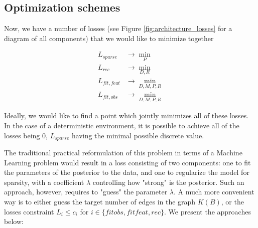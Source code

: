 \documentclass[a4paper,11pt,oneside]{report}
\begin{document}

\subsection{Optimization schemes}
Now, we have a number of losses (see Figure \ref{fig:architecture_losses} for a diagram of all components) that we would like to minimize together

\begin{equation}
\label{eq:all_losses}
\begin{array}{lc}
L_{sparse}&\to\min\limits_P\\
L_{rec}&\to\min\limits_{D,R}\\
L_{fit, feat}&\to\min\limits_{D,M,P,R}\\
L_{fit, obs}&\to\min\limits_{D,M,P,R}
\end{array}
\end{equation}

Ideally, we would like to find a point which jointly minimizes all of these losses. In the case of a deterministic environment, it is possible to achieve all of the losses being $0$, $L_{sparse}$ having the minimal possible discrete value.

The traditional practical reformulation of this problem in terms of a Machine Learning problem would result in a loss consisting of two components: one to fit the parameters of the posterior to the data, and one to regularize the model for sparsity, with a coefficient $\lambda$ controlling how "strong" is the posterior.
Such an approach, however, requires to "guess" the parameter $\lambda$.
A much more convenient way is to either guess the target number of edges in the graph $K(B)$, or the losses constraint $L_i\leq c_i$ for $i\in\{fitobs, fitfeat, rec\}$.
We present the approaches below:
\end{document}

